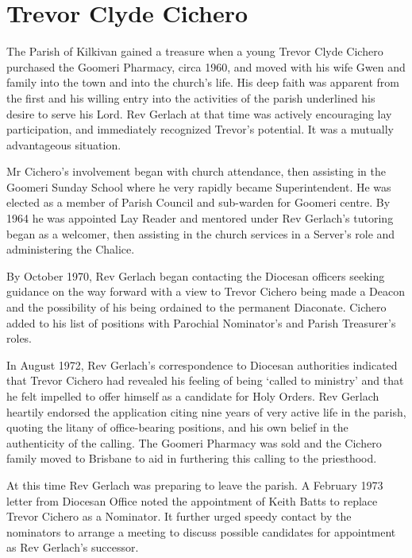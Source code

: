 \hypertarget{trevor-clyde-cichero}{%
\section{Trevor Clyde Cichero}\label{trevor-clyde-cichero}}

The Parish of Kilkivan gained a treasure when a young Trevor Clyde Cichero purchased the Goomeri Pharmacy, circa 1960, and moved with his wife Gwen and family into the town and into the church's life. His deep faith was apparent from the first and his willing entry into the activities of the parish underlined his desire to serve his Lord. Rev Gerlach at that time was actively encouraging lay participation, and immediately recognized Trevor's potential. It was a mutually advantageous situation.

Mr Cichero's involvement began with church attendance, then assisting in the Goomeri Sunday School where he very rapidly became Superintendent. He was elected as a member of Parish Council and sub-warden for Goomeri centre. By 1964 he was appointed Lay Reader and mentored under Rev Gerlach's tutoring began as a welcomer, then assisting in the church services in a Server's role and administering the Chalice.

By October 1970, Rev Gerlach began contacting the Diocesan officers seeking guidance on the way forward with a view to Trevor Cichero being made a Deacon and the possibility of his being ordained to the permanent Diaconate. Cichero added to his list of positions with Parochial Nominator's and Parish Treasurer's roles.

In August 1972, Rev Gerlach's correspondence to Diocesan authorities indicated that Trevor Cichero had revealed his feeling of being `called to ministry' and that he felt impelled to offer himself as a candidate for Holy Orders. Rev Gerlach heartily endorsed the application citing nine years of very active life in the parish, quoting the litany of office-bearing positions, and his own belief in the authenticity of the calling. The Goomeri Pharmacy was sold and the Cichero family moved to Brisbane to aid in furthering this calling to the priesthood.

At this time Rev Gerlach was preparing to leave the parish. A February 1973 letter from Diocesan Office noted the appointment of Keith Batts to replace Trevor Cichero as a Nominator. It further urged speedy contact by the nominators to arrange a meeting to discuss possible candidates for appointment as Rev Gerlach's successor.

